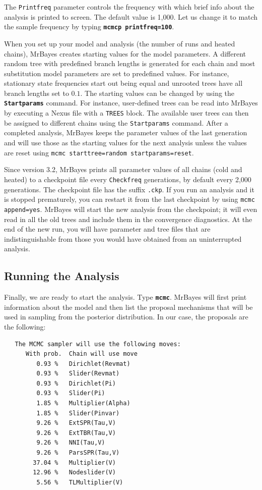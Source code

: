 \documentclass[12pt]{book}
\newcommand{\ttt}[1]{\texttt{#1}}
\newcommand{\tb}[1]{\ttt{\textbf{#1}}}
\begin{document}
The \ttt{Printfreq} parameter controls the frequency with which brief info about the analysis is
printed to screen. The default value is 1,000. Let us change it to match the sample frequency by
typing \tb{mcmcp printfreq=100}.

When you set up your model and analysis (the number of runs and heated chains), MrBayes creates
starting values for the model parameters. A different random tree with predefined branch lengths is
generated for each chain and most substitution model parameters are set to predefined values. For
instance, stationary state frequencies start out being equal and unrooted trees have all branch
lengths set to $0.1$. The starting values can be changed by using the \tb{Startparams} command.
For instance, user-defined trees can be read into MrBayes by executing a Nexus file with a
\ttt{TREES} block. The available user trees can then be assigned to different chains using the
\ttt{Startparams} command. After a completed analysis, MrBayes keeps the parameter values of the
last generation and will use those as the starting values for the next analysis unless the values
are reset using \ttt{mcmc starttree=random startparams=reset}.

Since version 3.2, MrBayes prints all parameter values of all chains (cold and heated) to a
checkpoint file every \ttt{Checkfreq} generations, by default every 2,000 generations. The
checkpoint file has the suffix \ttt{.ckp}. If you run an analysis and it is stopped prematurely,
you can restart it from the last checkpoint by using \ttt{mcmc append=yes}. MrBayes will start the
new analysis from the checkpoint; it will even read in all the old trees and include them in the
convergence diagnostics. At the end of the new run, you will have parameter and tree files that are
indistinguishable from those you would have obtained from an uninterrupted analysis.

\subsection{Running the Analysis}

Finally, we are ready to start the analysis. Type \tb{mcmc}. MrBayes will first print information
about the model and then list the proposal mechanisms that will be used in sampling from the
posterior distribution. In our case, the proposals are the following:

\begin{singlespacing}
\footnotesize
\begin{verbatim}
   The MCMC sampler will use the following moves:
      With prob.  Chain will use move
         0.93 %   Dirichlet(Revmat)
         0.93 %   Slider(Revmat)
         0.93 %   Dirichlet(Pi)
         0.93 %   Slider(Pi)
         1.85 %   Multiplier(Alpha)
         1.85 %   Slider(Pinvar)
         9.26 %   ExtSPR(Tau,V)
         9.26 %   ExtTBR(Tau,V)
         9.26 %   NNI(Tau,V)
         9.26 %   ParsSPR(Tau,V)
        37.04 %   Multiplier(V)
        12.96 %   Nodeslider(V)
         5.56 %   TLMultiplier(V)
\end{verbatim}
\normalsize
\end{singlespacing}
\end{document}
